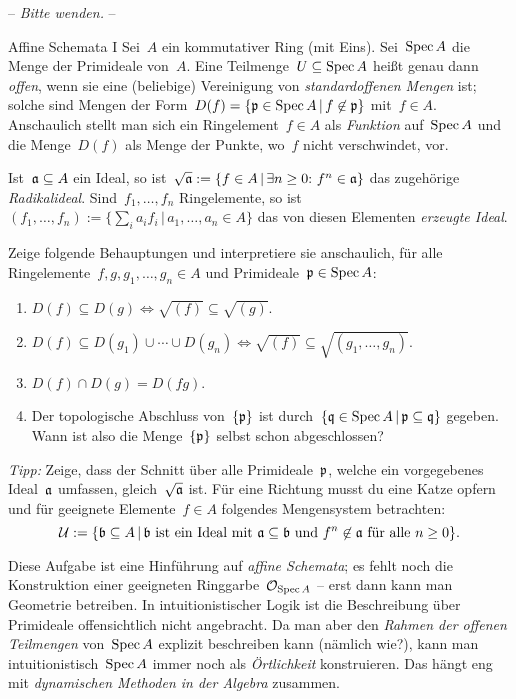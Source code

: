\documentclass{uebblatt}
\begin{document}
\begin{center}-- \emph{Bitte wenden.} --\end{center}

\newpage

\begin{aufgabe}{Affine Schemata I}
Sei~$A$ ein kommutativer Ring (mit Eins). Sei~$\operatorname{Spec} A$ die Menge der Primideale
von~$A$. Eine Teilmenge~$U \subseteq \operatorname{Spec} A$ heißt genau dann \emph{offen},
wenn sie eine (beliebige) Vereinigung von \emph{standardoffenen Mengen}
ist; solche sind Mengen der Form~$D(f) = \{ \mathfrak{p} \in \operatorname{Spec} A \,|\, f \not\in
\mathfrak{p} \}$ mit~$f \in A$. Anschaulich stellt man sich ein Ringelement~$f \in A$
als \emph{Funktion} auf~$\operatorname{Spec} A$ und die Menge~$D(f)$ als Menge der Punkte,
wo~$f$ nicht verschwindet, vor.

Ist~$\mathfrak{a} \subseteq A$ ein Ideal, so ist~$\sqrt{\mathfrak{a}} := \{ f \in A \,|\,
\exists n \geq 0{:}\ f^n \in \mathfrak{a} \}$ das zugehörige \emph{Radikalideal}.
Sind~$f_1,\ldots,f_n$ Ringelemente, so ist~$(f_1,\ldots,f_n) := \{ \sum_i a_i
f_i \,|\, a_1,\ldots,a_n \in A \}$ das von diesen Elementen \emph{erzeugte
Ideal}.

Zeige folgende Behauptungen und interpretiere sie anschaulich, für alle
Ringelemente~$f,g,g_1,\ldots,g_n \in A$ und Primideale~$\mathfrak{p} \in \operatorname{Spec} A$:
\begin{enumerate}
\item $D(f) \subseteq D(g) \Longleftrightarrow \sqrt{(f)} \subseteq
\sqrt{(g)}$.
\item $D(f) \subseteq D(g_1) \cup \cdots \cup D(g_n) \Longleftrightarrow
\sqrt{(f)} \subseteq \sqrt{(g_1,\ldots,g_n)}$.
\item $D(f) \cap D(g) = D(fg)$.
\item Der topologische Abschluss von~$\{\mathfrak{p}\}$ ist
durch~$\{ \mathfrak{q} \in \operatorname{Spec} A \,|\, \mathfrak{p} \subseteq \mathfrak{q} \}$ gegeben.
Wann ist also die Menge~$\{\mathfrak{p}\}$ selbst schon abgeschlossen?
\end{enumerate}

\emph{Tipp:} Zeige, dass der Schnitt über alle Primideale~$\mathfrak{p}$, welche ein
vorgegebenes Ideal~$\mathfrak{a}$ umfassen, gleich~$\sqrt{\mathfrak{a}}$ ist. Für eine Richtung
musst du eine Katze opfern und für geeignete Elemente~$f \in A$
folgendes Mengensystem betrachten:
\[ \mathcal{U} := \{ \mathfrak{b} \subseteq A \,|\, \text{$\mathfrak{b}$ ist ein Ideal mit $\mathfrak{a}
\subseteq \mathfrak{b}$ und~$f^n \not\in \mathfrak{a}$ für alle~$n \geq 0$} \}. \]

Diese Aufgabe ist eine Hinführung auf \emph{affine Schemata}; es fehlt noch
die Konstruktion einer geeigneten Ringgarbe~$\mathcal{O}_{\operatorname{Spec} A}$ -- erst dann kann
man Geometrie betreiben.
In intuitionistischer Logik ist die Beschreibung über
Primideale offensichtlich nicht angebracht. Da man aber den \emph{Rahmen der
offenen Teilmengen} von~$\operatorname{Spec} A$ explizit beschreiben kann (nämlich wie?),
kann man intuitionistisch~$\operatorname{Spec} A$ immer noch als \emph{Örtlichkeit}
konstruieren. Das hängt eng mit \emph{dynamischen Methoden in der Algebra}
zusammen.
\end{aufgabe}
\enlargethispage{2em}
\end{document}
